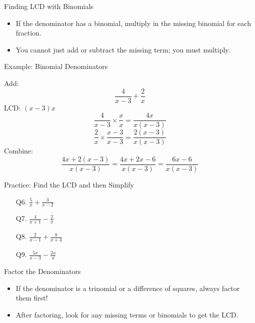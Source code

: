 \documentclass[aspectratio=169]{beamer}
\begin{document}
\begin{frame}{Finding LCD with Binomials}
\begin{tcolorbox}[colback=lightgray,colframe=primary,title=Key Concepts]
\footnotesize
\begin{itemize}
  \item If the denominator has a binomial, multiply in the missing binomial for each fraction.
  \item You cannot just add or subtract the missing term; you must multiply.
\end{itemize}
\end{tcolorbox}
\end{frame}

\begin{frame}{Example: Binomial Denominators}
\begin{tcolorbox}[colback=lightgray,colframe=secondary,title=Example 2]
\footnotesize
Add:
\[
\frac{4}{x-3} + \frac{2}{x}
\]
LCD: $(x-3)x$
\[
\frac{4}{x-3} \times \frac{x}{x} = \frac{4x}{x(x-3)}
\]
\[
\frac{2}{x} \times \frac{x-3}{x-3} = \frac{2(x-3)}{x(x-3)}
\]
Combine:
\[
\frac{4x + 2(x-3)}{x(x-3)} = \frac{4x + 2x - 6}{x(x-3)} = \frac{6x-6}{x(x-3)}
\]
\end{tcolorbox}
\end{frame}

\begin{frame}{Practice: Find the LCD and then Simplify}
\begin{tcolorbox}[colback=lightgray,colframe=primary,title=Practice Problems]
\footnotesize
\begin{enumerate}
  \item[Q6.] $\frac{5}{x} + \frac{3}{x-2}$
  \item[Q7.] $\frac{4}{x+1} - \frac{2}{x}$
  \item[Q8.] $\frac{2}{x-1} + \frac{8}{x+4}$
  \item[Q9.] $\frac{5x}{x-3} - \frac{2x}{x}$
\end{enumerate}
\end{tcolorbox}
\end{frame}

\begin{frame}{Factor the Denominators}
\begin{tcolorbox}[colback=lightgray,colframe=primary,title=Key Concepts]
\footnotesize
\begin{itemize}
  \item If the denominator is a trinomial or a difference of squares, always factor them first!
  \item After factoring, look for any missing terms or binomials to get the LCD.
\end{itemize}
\end{tcolorbox}
\end{frame}
\end{document}
